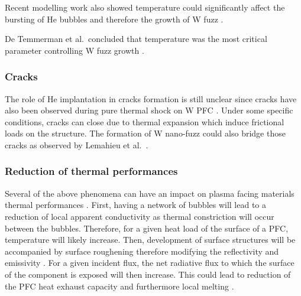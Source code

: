 Recent modelling work also showed temperature could significantly affect the bursting of He bubbles and therefore the growth of W \gls{fuzz} .

De Temmerman et al.\ concluded that temperature was the most critical parameter controlling W \gls{fuzz} growth .

\subsubsection{Cracks}

The role of He implantation in cracks formation is still unclear since cracks have also been observed during pure thermal shock on W PFC .
Under some specific conditions, cracks can close due to thermal expansion which induce frictional loads on the structure.
The formation of W nano-fuzz could also bridge those cracks as observed by Lemahieu et al.\ .

\subsubsection{Reduction of thermal performances}

Several of the above phenomena can have an impact on \gls{plasma} facing materials thermal performances .
First, having a network of bubbles will lead to a reduction of local apparent conductivity as thermal constriction will occur between the bubbles.
Therefore, for a given heat load of the surface of a PFC, temperature will likely increase.
Then, development of surface structures will be accompanied by surface roughening therefore modifying the reflectivity and emissivity .
For a given incident flux, the net radiative flux to which the surface of the component is exposed will then increase.
This could lead to reduction of the PFC heat exhaust capacity and furthermore local melting .




